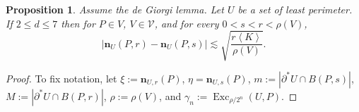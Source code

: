 \documentclass[reqno,10pt]{amsart}
\DeclareMathOperator{\Exc}{Exc}
\newcommand{\normal}{\mathbf n}
\def\Japan#1{\left \langle #1 \right \rangle}
\newtheorem{proposition}[theorem]{Proposition}
\theoremstyle{definition}
\numberwithin{equation}{section}
\begin{document}
\begin{proposition}\label{implication of DGL}
    Assume the de Giorgi lemma. Let $U$ be a set of least perimeter.
    If $2 \leq d \leq 7$ then for $P \in V$, $V \in \mathcal V$, and for every $0 < s < r < \rho(V)$,
    \begin{equation}\label{LC Cauchy}
    |\normal_U(P, r) - \normal_U(P, s)| \lesssim \sqrt{\frac{r \Japan K}{\rho(V)}}.
    \end{equation}
\end{proposition}
\begin{proof}
To fix notation, let
$\xi := \normal_{U, r}(P)$, $\eta = \normal_{U, s}(P)$, $m := |\partial^* U \cap B(P, s)|$, $M := |\partial^* U \cap B(P, r)|$, $\rho := \rho(V)$, and $\gamma_n := \Exc_{\rho/2^n}(U, P)$.


\end{proof}
\end{document}
